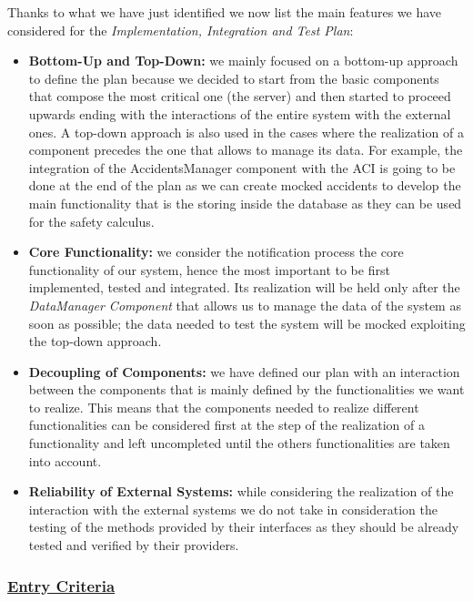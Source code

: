 		Thanks to what we have just identified we now list the main features we have considered for the \emph{Implementation, Integration and Test Plan}:
		
		\begin{itemize}
			\item \textbf{Bottom-Up and Top-Down:} we mainly focused on a bottom-up approach to define the plan because we decided to start from the basic components that compose the most critical one (the server) and then started to proceed upwards ending with the interactions of the entire system with the external ones. A top-down approach is also used in the cases where the realization of a component precedes the one that allows to manage its data. For example, the integration of the AccidentsManager component with the ACI is going to be done at the end of the plan as we can create mocked accidents to develop the main functionality that is the storing inside the database as they can be used for the safety calculus.
			
			\item \textbf{Core Functionality:} we consider the notification process the core functionality of our system, hence the most important to be first implemented, tested and integrated. Its realization will be held only after the \emph{DataManager Component} that allows us to manage the data of the system as soon as possible; the data needed to test the system will be mocked exploiting the top-down approach.
			
			\item \textbf{Decoupling of Components:} we have defined our plan with an interaction between the components that is mainly defined by the functionalities we want to realize. This means that the components needed to realize different functionalities can be considered first at the step of the realization of a functionality and left uncompleted until the others functionalities are taken into account.
			
			\item \textbf{Reliability of External Systems:} while considering the realization of the interaction with the external systems we do not take in consideration the testing of the methods provided by their interfaces as they should be already tested and verified by their providers. 
		\end{itemize}
	
	\subsubsection[Entry Criteria]{\hyperlink{toc}{Entry Criteria}}
		\label{sec:entryCriteria}
		

